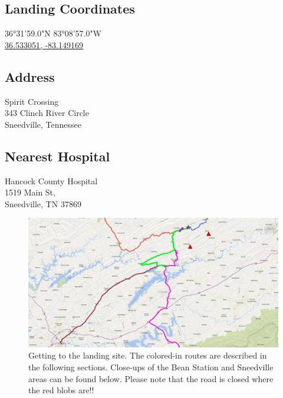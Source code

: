 \begin{multicols}{3}

\subsection*{Landing Coordinates}
36\si{\degree}31'59.0"N 83\si{\degree}08'57.0"W\\
\href{https://goo.gl/maps/pc3gYuNiF2r}{36.533051, -83.149169}

\subsection*{Address}
Spirit Crossing\\
343 Clinch River Circle\\
Sneedville, Tennessee

\subsection*{Nearest Hospital}
Hancock County Hospital\\
1519 Main St,\\
Sneedville, TN 37869

\end{multicols}

\begin{figure}
\centering
\includegraphics[width=\textwidth]{images/overviewMap.png}
\caption{Getting to the landing site. The colored-in routes are described in the following sections. Close-ups of the Bean Station and Sneedville areas can be found below. Please note that the road is closed where the red blobs are!!}
\label{image:overviewmap}
\end{figure}

